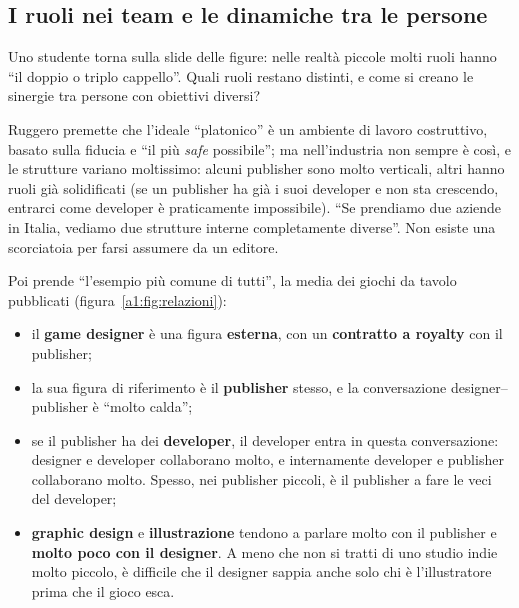 \subsection{I ruoli nei team e le dinamiche tra le persone}

Uno studente torna sulla slide delle figure: nelle realtà piccole molti ruoli
hanno ``il doppio o triplo cappello''. Quali ruoli restano distinti, e come si
creano le sinergie tra persone con obiettivi diversi?

Ruggero premette che l'ideale ``platonico'' è un ambiente di lavoro costruttivo,
basato sulla fiducia e ``il più \emph{safe} possibile''; ma nell'industria non
sempre è così, e le strutture variano moltissimo: alcuni publisher sono molto
verticali, altri hanno ruoli già solidificati (se un publisher ha già i suoi
developer e non sta crescendo, entrarci come developer è praticamente
impossibile). ``Se prendiamo due aziende in Italia, vediamo due strutture
interne completamente diverse''. Non esiste una scorciatoia per farsi assumere
da un editore.

Poi prende ``l'esempio più comune di tutti'', la media dei giochi da tavolo
pubblicati (figura~\ref{a1:fig:relazioni}):
\begin{itemize}
  \item il \textbf{game designer} è una figura \textbf{esterna}, con un
        \textbf{contratto a royalty} con il publisher;
  \item la sua figura di riferimento è il \textbf{publisher} stesso, e la
        conversazione designer--publisher è ``molto calda'';
  \item se il publisher ha dei \textbf{developer}, il developer entra in questa
        conversazione: designer e developer collaborano molto, e internamente
        developer e publisher collaborano molto. Spesso, nei publisher piccoli,
        è il publisher a fare le veci del developer;
  \item \textbf{graphic design} e \textbf{illustrazione} tendono a parlare molto
        con il publisher e \textbf{molto poco con il designer}. A meno che non si
        tratti di uno studio indie molto piccolo, è difficile che il designer
        sappia anche solo chi è l'illustratore prima che il gioco esca.
\end{itemize}

